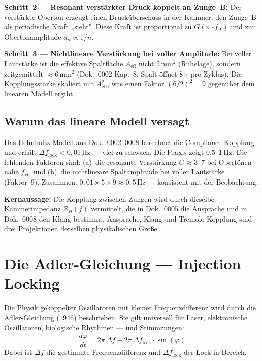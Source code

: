 \documentclass[11pt,a4paper]{article}
\begin{document}
\textbf{Schritt~2 --- Resonant verstärkter Druck koppelt an Zunge~B:} Der verstärkte Oberton erzeugt einen Drucküberschuss in der Kammer, den Zunge~B als periodische Kraft „sieht". Diese Kraft ist proportional zu $G(n \cdot f_A)$ und zur Obertonamplitude $a_n \propto 1/n$.

\textbf{Schritt~3 --- Nichtlineare Verstärkung bei voller Amplitude:} Bei voller Lautstärke ist die effektive Spaltfläche $A_\text{eff}$ nicht $2\,\text{mm}^2$ (Ruhelage), sondern zeitgemittelt $\approx 6\,\text{mm}^2$ (Dok.~0002 Kap.~8: Spalt öffnet 8$\times$ pro Zyklus). Die Kopplungsstärke skaliert mit $A_\text{eff}^2$, was einen Faktor $(6/2)^2 = 9$ gegenüber dem linearen Modell ergibt.

\subsection{Warum das lineare Modell versagt}

Das Helmholtz-Modell aus Dok.~0002--0008 berechnet die Compliance-Kopplung und erhält $\Delta f_\text{lock} < 0{,}01$\,Hz --- viel zu schwach. Die Praxis zeigt 0,5--1\,Hz. Die fehlenden Faktoren sind: (a)~die resonante Verstärkung $G \approx 3$--$7$ bei Obertönen nahe $f_H$, und (b)~die nichtlineare Spaltamplitude bei voller Lautstärke (Faktor~9). Zusammen: $0{,}01 \times 5 \times 9 \approx 0{,}5$\,Hz --- konsistent mit der Beobachtung.

\begin{keybox}
\textbf{Kernaussage:} Die Kopplung zwischen Zungen wird durch dieselbe Kammerimpedanz $Z_H(f)$ vermittelt, die in Dok.~0005 die Ansprache und in Dok.~0008 den Klang bestimmt. Ansprache, Klang und Tremolo-Kopplung sind drei Projektionen derselben physikalischen Größe.
\end{keybox}

\section{Die Adler-Gleichung --- Injection Locking}

Die Physik gekoppelter Oszillatoren mit kleiner Frequenzdifferenz wird durch die Adler-Gleichung (1946) beschrieben. Sie gilt universell für Laser, elektronische Oszillatoren, biologische Rhythmen --- und Stimmzungen:
\begin{equation}
\frac{d\varphi}{dt} = 2\pi\,\Delta f - 2\pi\,\Delta f_\text{lock} \cdot \sin(\varphi)
\end{equation}
Dabei ist $\Delta f$ die gestimmte Frequenzdifferenz und $\Delta f_\text{lock}$ der Lock-in-Bereich.
\end{document}
